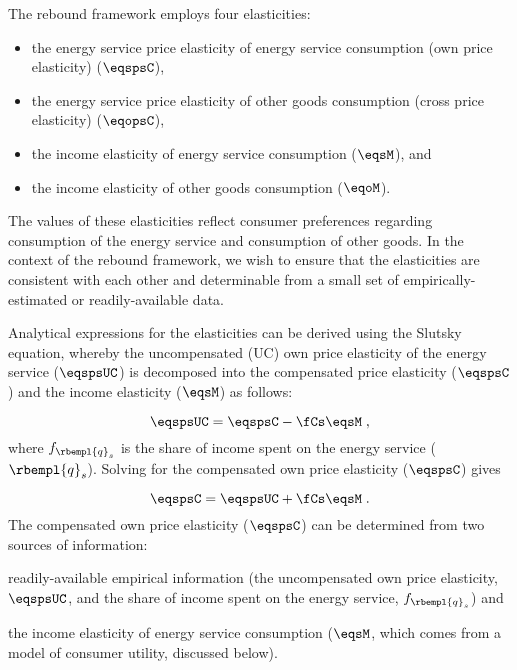 

The rebound framework employs four elasticities:
%
\begin{itemize}

  \item the energy service price elasticity of energy service consumption (own price elasticity) ($\eqspsC$),

  \item the energy service price elasticity of other goods consumption (cross price elasticity) ($\eqopsC$), 
  
  \item the income elasticity of energy service consumption ($\eqsM$), and 
  
  \item the income elasticity of other goods consumption ($\eqoM$).

\end{itemize}
%
The values of these elasticities reflect consumer preferences regarding 
consumption of the energy service and consumption of other goods.
In the context of the rebound framework, 
we wish to ensure that the elasticities are consistent with each other
and determinable from a small set 
of empirically-estimated or readily-available data. 

Analytical expressions for the elasticities can be derived using the Slutsky equation, 
whereby the uncompensated (UC) own price elasticity 
of the energy service ($\eqspsUC$) 
is decomposed into the compensated price elasticity ($\eqspsC$) and
the income elasticity ($\eqsM$) as follows:

\begin{equation}
  \eqspsUC = \eqspsC - \fCs \eqsM \; ,
\end{equation}
%
where $f_{\rbempl{q}_s}$ is the share of income spent 
on the energy service ($\rbempl{q}_s$). 
Solving for the compensated own price elasticity ($\eqspsC$) gives

\begin{equation} \label{eq:eqsps}
  \eqspsC = \eqspsUC + \fCs \eqsM \; .
\end{equation}
%
The compensated own price elasticity ($\eqspsC$)
can be determined from two sources of information:
%
\begin{enumerate*}[label={(\alph*)}]
	
  \item readily-available empirical information
        (the uncompensated own price elasticity, $\eqspsUC$, and 
        the share of income spent on the energy service, $f_{\rbempl{q}_s}$)
        and 
  
  \item the income elasticity of energy service consumption 
        ($\eqsM$, which comes from a model of consumer utility, discussed below).
    
\end{enumerate*}

